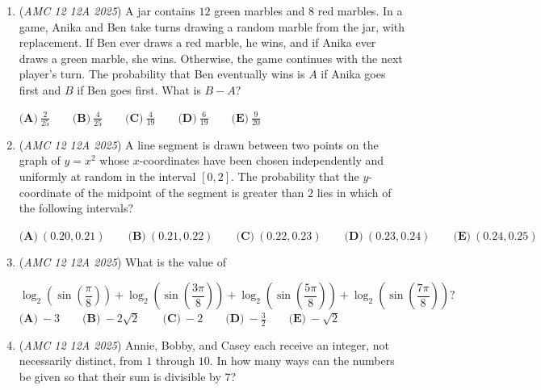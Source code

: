 \begin{enumerate}
 $\textbf{(A)}\   0  \qquad                 \textbf{(B)}\   \frac{\sqrt{3}}{2}  \qquad                 \textbf{(C)}\   1  \qquad                 \textbf{(D)}\   \sqrt{3}  \qquad                 \textbf{(E)}\   2$


	\item (\textit{AMC 12 12A 2025}) A jar contains $12$ green marbles and $8$ red marbles. In a game, Anika and Ben take turns drawing a random marble from the jar, with replacement. If Ben ever draws a red marble, he wins, and if Anika ever draws a green marble, she wins. Otherwise, the game continues with the next player's turn. The probability that Ben eventually wins is $A$ if Anika goes first and $B$ if Ben goes first. What is $B - A$?


 $\textbf{(A)}\   \frac{2}{25}  \qquad                 \textbf{(B)}\   \frac{4}{25}  \qquad                 \textbf{(C)}\   \frac{4}{19}  \qquad                 \textbf{(D)}\   \frac{6}{19}  \qquad                 \textbf{(E)}\   \frac{9}{20}$


	\item (\textit{AMC 12 12A 2025}) A line segment is drawn between two points on the graph of $y = x^{2}$ whose $x$-coordinates have been chosen independently and uniformly at random in the interval $[0,2]$. The probability that the $y$-coordinate of the midpoint of the segment is greater than $2$ lies in which of the following intervals?


 $\textbf{(A)}\   (0.20, 0.21)  \qquad                 \textbf{(B)}\   (0.21, 0.22)  \qquad                 \textbf{(C)}\   (0.22, 0.23)  \qquad                 \textbf{(D)}\   (0.23, 0.24)  \qquad                 \textbf{(E)}\   (0.24, 0.25)$


	\item (\textit{AMC 12 12A 2025}) What is the value of

 \[\log_{2}\left( \sin\left( \frac{\pi}{8} \right)  \right) + \log_{2}\left( \sin\left( \frac{3\pi}{8} \right)  \right) + \log_{2}\left( \sin\left( \frac{5\pi}{8} \right)  \right) + \log_{2}\left( \sin\left( \frac{7\pi}{8} \right)  \right)?\]
$\textbf{(A)}\   -3  \qquad                 \textbf{(B)}\   -2\sqrt{2}  \qquad                 \textbf{(C)}\   -2  \qquad                 \textbf{(D)}\   -\frac{3}{2}  \qquad                 \textbf{(E)}\   -\sqrt{2}$


	\item (\textit{AMC 12 12A 2025}) Annie, Bobby, and Casey each receive an integer, not necessarily distinct, from $1$ through $10$. In how many ways can the numbers be given so that their sum is divisible by $7$?



\end{enumerate}
